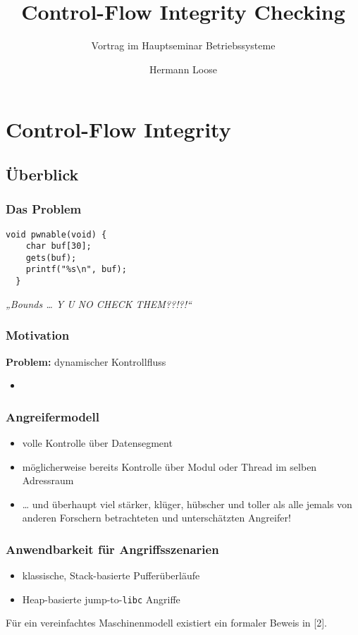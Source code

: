 \documentclass[serif,slidestop,compress,red]{beamer}
\title{Control-Flow Integrity Checking}
\subtitle{Vortrag im Hauptseminar Betriebssysteme}
\author{Hermann Loose}
\begin{document}
\lstset{
  language=[x86masm]Assembler,
  basicstyle=\ttfamily
}

\frame[plain]{\titlepage}

\section{Control-Flow Integrity}

\subsection{Überblick}

\begin{frame}[fragile]
  \frametitle{Das Problem}
  \begin{lstlisting}[escapechar=!]
  void pwnable(void) {
    char buf[30];
    gets(buf);
    printf("%s\n", buf);
  }
  \end{lstlisting}
  \begin{flushright}
  \emph{„Bounds … Y U NO CHECK THEM??!?!“}
  \end{flushright}
\end{frame}

\begin{frame}
  \frametitle{Motivation}
  \textbf{Problem:} dynamischer Kontrollfluss
  \begin{itemize}
    \item
  \end{itemize}
\end{frame}

\begin{frame}
  \frametitle{Angreifermodell}
  \begin{itemize}
    \item volle Kontrolle über Datensegment
    \item möglicherweise bereits Kontrolle über Modul oder Thread im selben Adressraum
    \item … und überhaupt viel stärker, klüger, hübscher und toller als alle
    jemals von anderen Forschern betrachteten und unterschätzten Angreifer!
  \end{itemize}
\end{frame}

\begin{frame}
  \frametitle{Anwendbarkeit für Angriffsszenarien}
  \begin{itemize}
    \item klassische, Stack-basierte Pufferüberläufe
    \item Heap-basierte jump-to-\texttt{libc} Angriffe
  \end{itemize}
  Für ein vereinfachtes Maschinenmodell existiert ein formaler Beweis in [2].
\end{frame}
\end{document}
